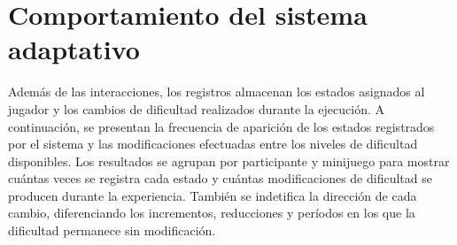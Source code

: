 \section{Comportamiento del sistema adaptativo}
Además de las interacciones, los registros almacenan los estados 
asignados al jugador y los cambios de dificultad realizados durante la 
ejecución. A continuación, se presentan la frecuencia de aparición de 
los estados registrados por el sistema y las modificaciones efectuadas 
entre los niveles de dificultad disponibles. Los resultados se agrupan 
por participante y minijuego para mostrar cuántas veces se registra cada 
estado y cuántas modificaciones de dificultad se producen durante la 
experiencia. También se indetifica la dirección de cada cambio, 
diferenciando los incrementos, reducciones y períodos en los que la 
dificultad permanece sin modificación.

